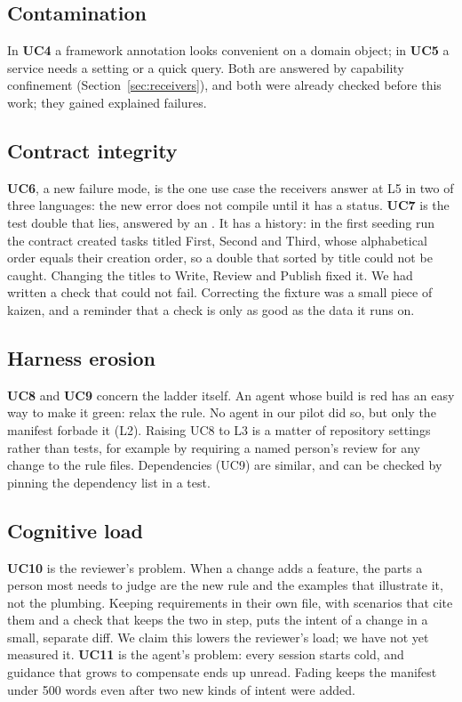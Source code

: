 \subsection{Contamination}

In \textbf{UC4} a framework annotation looks convenient on a domain object; in \textbf{UC5} a
service needs a setting or a quick query. Both are answered by capability confinement
(Section~\ref{sec:receivers}), and both were already checked before this work; they gained
explained failures.

\subsection{Contract integrity}

\textbf{UC6}, a new failure mode, is the one use case the receivers answer at L5 in two of three
languages: the new error does not compile until it has a status. \textbf{UC7} is the test double
that lies, answered by an . It has a history: in the first seeding run the
contract created tasks titled First, Second and Third, whose alphabetical order equals their
creation order, so a double that sorted by title could not be caught. Changing the titles to
Write, Review and Publish fixed it. We had written a check that could not fail. Correcting the
fixture was a small piece of kaizen, and a reminder that a check is only as good as the data it
runs on.

\subsection{Harness erosion}

\textbf{UC8} and \textbf{UC9} concern the ladder itself. An agent whose build is red has an easy
way to make it green: relax the rule. No agent in our pilot did so, but only the manifest forbade
it (L2). Raising UC8 to L3 is a matter of repository settings rather than tests, for example by
requiring a named person's review for any change to the rule files. Dependencies (UC9) are
similar, and can be checked by pinning the dependency list in a test.

\subsection{Cognitive load}

\textbf{UC10} is the reviewer's problem. When a change adds a feature, the parts a person most
needs to judge are the new rule and the examples that illustrate it, not the plumbing. Keeping
requirements in their own file, with scenarios that cite them and a check that keeps the two in
step, puts the intent of a change in a small, separate diff. We claim this lowers the reviewer's
load; we have not yet measured it. \textbf{UC11} is the agent's problem: every session starts
cold, and guidance that grows to compensate ends up unread. Fading keeps the manifest under 500
words even after two new kinds of intent were added.

